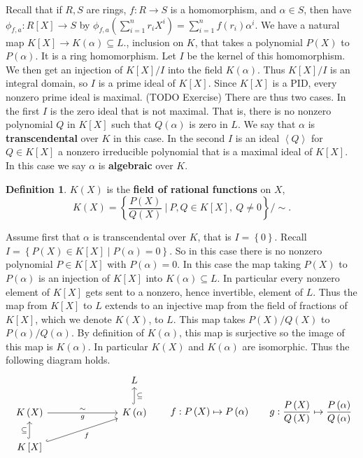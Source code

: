 \documentclass{article}
\newcommand{\rb}[1]{\left( #1 \right)}
\renewcommand{\sb}[1]{\left[ #1 \right]}
\newcommand{\cb}[1]{\left\{ #1 \right\}}
\newcommand{\ab}[1]{\left\langle #1 \right\rangle}
\theoremstyle{definition}\newtheorem{definition}{Definition}[subsection]
\theoremstyle{definition}\newtheorem{remark}[definition]{Remark}
\theoremstyle{definition}\newtheorem*{example}{Example}
\theoremstyle{definition}\newtheorem*{note}{Note}
\begin{document}
Recall that if $ R, S $ are rings, $ f : R \to S $ is a homomorphism, and $ \alpha \in S $, then have $ \phi_{f, a} : R\sb{X} \to S $ by $ \phi_{f, a}\rb{\sum_{i = 1}^n r_iX^i} = \sum_{i = 1}^n f\rb{r_i}\alpha^i $. We have a natural map $ K\sb{X} \to K\rb{\alpha} \subseteq L. $, inclusion on $ K $, that takes a polynomial $ P\rb{X} $ to $ P\rb{\alpha} $. It is a ring homomorphism. Let $ I $ be the kernel of this homomorphism. We then get an injection of $ K\sb{X} / I $ into the field $ K\rb{\alpha} $. Thus $ K\sb{X} / I $ is an integral domain, so $ I $ is a prime ideal of $ K\sb{X} $. Since $ K\sb{X} $ is a PID, every nonzero prime ideal is maximal. (TODO Exercise) There are thus two cases. In the first $ I $ is the zero ideal that is not maximal. That is, there is no nonzero polynomial $ Q $ in $ K\sb{X} $ such that $ Q\rb{\alpha} $ is zero in $ L $. We say that $ \alpha $ is \textbf{transcendental} over $ K $ in this case. In the second $ I $ is an ideal $ \ab{Q} $ for $ Q \in K\sb{X} $ a nonzero irreducible polynomial that is a maximal ideal of $ K\sb{X} $. In this case we say $ \alpha $ is \textbf{algebraic} over $ K $.

\begin{definition}
$ K\rb{X} $ is the \textbf{field of rational functions} on $ X $,
$$ K\rb{X} = \cb{\dfrac{P\rb{X}}{Q\rb{X}} \ \Bigg| \ P, Q \in K\sb{X}, \ Q \ne 0} / \sim. $$
\end{definition}

Assume first that $ \alpha $ is transcendental over $ K $, that is $ I = \cb{0} $. Recall $ I = \cb{P\rb{X} \in K\sb{X} \mid P\rb{\alpha} = 0} $. So in this case there is no nonzero polynomial $ P \in K\sb{X} $ with $ P\rb{\alpha} = 0 $. In this case the map taking $ P\rb{X} $ to $ P\rb{\alpha} $ is an injection of $ K\sb{X} $ into $ K\rb{\alpha} \subseteq L $. In particular every nonzero element of $ K\sb{X} $ gets sent to a nonzero, hence invertible, element of $ L $. Thus the map from $ K\sb{X} $ to $ L $ extends to an injective map from the field of fractions of $ K\sb{X} $, which we denote $ K\rb{X} $, to $ L $. This map takes $ P\rb{X} / Q\rb{X} $ to $ P\rb{\alpha} / Q\rb{\alpha} $. By definition of $ K\rb{\alpha} $, this map is surjective so the image of this map is $ K\rb{\alpha} $. In particular $ K\rb{X} $ and $ K\rb{\alpha} $ are isomorphic. Thus the following diagram holds.
$$
\begin{tikzcd}[column sep=1in]
& L \\
K\rb{X} \arrow{r}{\sim}[swap]{g} & K\rb{\alpha} \arrow[hookrightarrow, swap]{u}{\subseteq} \\
K\sb{X} \arrow[hookrightarrow]{u}{\subseteq} \arrow[hookrightarrow, swap]{ur}{f}
\end{tikzcd}
\qquad f : P\rb{X} \mapsto P\rb{\alpha} \qquad g : \dfrac{P\rb{X}}{Q\rb{X}} \mapsto \dfrac{P\rb{\alpha}}{Q\rb{\alpha}}
$$
\end{document}
